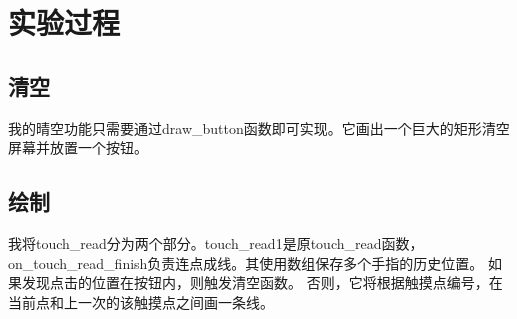 \documentclass{report}
\begin{document}
\section{实验过程}

\subsection{清空}

\par 我的晴空功能只需要通过draw\_button函数即可实现。它画出一个巨大的矩形清空屏幕并放置一个按钮。

\subsection{绘制}
我将touch\_read分为两个部分。touch\_read1是原touch\_read函数，on\_touch\_read\_finish负责连点成线。其使用数组保存多个手指的历史位置。
如果发现点击的位置在按钮内，则触发清空函数。
否则，它将根据触摸点编号，在当前点和上一次的该触摸点之间画一条线。
\end{document}

